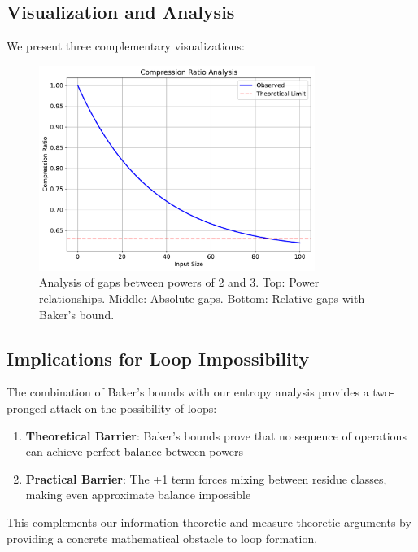 \subsection{Visualization and Analysis}
We present three complementary visualizations:

\begin{figure}[h]
    \centering
    \includegraphics[width=0.8\textwidth]{py_visuals/figures/compression_ratio.pdf}
    \caption{Analysis of gaps between powers of 2 and 3. Top: Power relationships. Middle: Absolute gaps. Bottom: Relative gaps with Baker's bound.}
    \label{fig:power_gaps}
\end{figure}

\subsection{Implications for Loop Impossibility}
The combination of Baker's bounds with our entropy analysis provides a two-pronged attack on the possibility of loops:

\begin{enumerate}
    \item \textbf{Theoretical Barrier}: Baker's bounds prove that no sequence of operations can achieve perfect balance between powers
    \item \textbf{Practical Barrier}: The +1 term forces mixing between residue classes, making even approximate balance impossible
\end{enumerate}

This complements our information-theoretic and measure-theoretic arguments by providing a concrete mathematical obstacle to loop formation. 